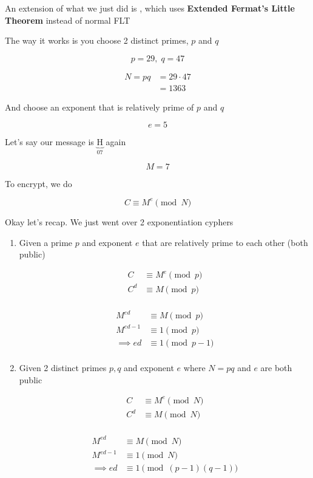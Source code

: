\documentclass[../../Main.tex]{subfiles}
\begin{document}
\begin{definition}
    An extension of what we just did is , which uses \textbf{Extended Fermat's Little Theorem} instead of normal FLT

    The way it works is you choose 2 distinct primes, $p$ and $q$

    $$p = 29, \; q = 47$$

    \begin{align*}
        N = pq &= 29 \cdot 47 \\
        &= 1363
    \end{align*}

    And choose an exponent that is relatively prime of $p$ and $q$

    $$e = 5$$

    Let's say our message is $\underbrace{\text{H}}_{07}$ again

    $$M = 7$$

    To encrypt, we do

    $$C \equiv M^e \pmod{N}$$
    
\end{definition}


Okay let's recap. We just went over 2 exponentiation cyphers

\begin{enumerate}
    \item
    {
        Given a prime $p$ and exponent $e$ that are relatively prime to each other (both public)

        \begin{align*}
            C &\equiv M^e \pmod{p} \\
            C^d &\equiv M \pmod{p} \\
        \end{align*}

        \begin{align*}
            M^{ed} &\equiv M \pmod{p} \\
            M^{ed - 1} &\equiv 1 \pmod{p} \\
            \implies ed &\equiv 1 \pmod{p - 1} \\
        \end{align*}
    }

    \item
    {
        Given 2 distinct primes $p, q$ and exponent $e$ where $N = pq$ and $e$ are both public

        \begin{align*}
            C &\equiv M^e \pmod{N} \\
            C^d &\equiv M \pmod{N} \\
        \end{align*}

        \begin{align*}
            M^{ed} &\equiv M \pmod{N} \\
            M^{ed - 1} &\equiv 1 \pmod{N} \\
            \implies ed &\equiv 1 \pmod{(p - 1)(q - 1)}
        \end{align*}
    }
\end{enumerate}
\end{document}
